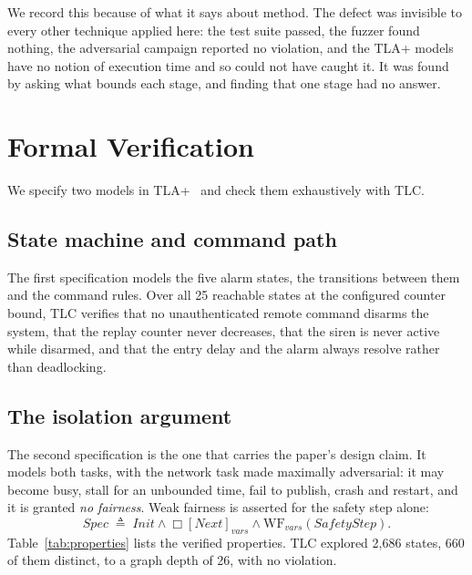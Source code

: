 We record this because of what it says about method. The defect was invisible to every other
technique applied here: the test suite passed, the fuzzer found nothing, the adversarial campaign
reported no violation, and the TLA+ models have no notion of execution time and so could not have
caught it. It was found by asking what bounds each stage, and finding that one stage had no
answer.

\section{Formal Verification}\label{sec:formal}

We specify two models in TLA+~\cite{lamport2002} and check them exhaustively with TLC.

\subsection{State machine and command path}

The first specification models the five alarm states, the transitions between them and the
command rules. Over all 25 reachable states at the configured counter bound, TLC verifies that no
unauthenticated remote command disarms the system, that the replay counter never decreases, that
the siren is never active while disarmed, and that the entry delay and the alarm always resolve
rather than deadlocking.

\subsection{The isolation argument}

The second specification is the one that carries the paper's design claim. It models both tasks,
with the network task made maximally adversarial: it may become busy, stall for an unbounded
time, fail to publish, crash and restart, and it is granted \emph{no fairness}. Weak fairness is
asserted for the safety step alone:
\begin{equation}
\mathit{Spec} \;\triangleq\; \mathit{Init} \wedge \Box[\mathit{Next}]_{\mathit{vars}} \wedge
\mathrm{WF}_{\mathit{vars}}(\mathit{SafetyStep}).
\label{eq:spec}
\end{equation}
Table~\ref{tab:properties} lists the verified properties. TLC explored 2{,}686 states, 660 of
them distinct, to a graph depth of 26, with no violation.

